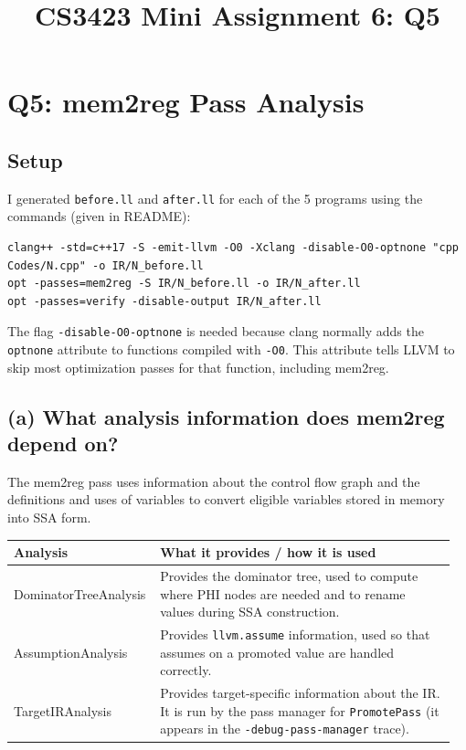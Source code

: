 \documentclass{article}
\title{CS3423 Mini Assignment 6: Q5}
\author{}
\date{}
\begin{document}
\maketitle

\section{Q5: mem2reg Pass Analysis}

\subsection{Setup}

I generated \texttt{before.ll} and \texttt{after.ll} for each of the 5
programs using the commands (given in README):

\begin{Verbatim}[fontsize=\small]
clang++ -std=c++17 -S -emit-llvm -O0 -Xclang -disable-O0-optnone "cpp Codes/N.cpp" -o IR/N_before.ll
opt -passes=mem2reg -S IR/N_before.ll -o IR/N_after.ll
opt -passes=verify -disable-output IR/N_after.ll
\end{Verbatim}

The flag \texttt{-disable-O0-optnone} is needed because clang normally
adds the \texttt{optnone} attribute to functions compiled with
\texttt{-O0}. This attribute tells LLVM to skip most optimization passes
for that function, including mem2reg.

\subsection{(a) What analysis information does mem2reg depend on?}

The mem2reg pass uses information about the control flow graph and the
definitions and uses of variables to convert eligible variables stored
in memory into SSA form.

\medskip
\noindent
\begin{tabular}{@{}p{0.30\linewidth}p{0.66\linewidth}@{}}
\toprule
Analysis & What it provides / how it is used \\
\midrule
DominatorTreeAnalysis & Provides the dominator tree, used to compute where
PHI nodes are needed and to rename values during SSA construction. \\
AssumptionAnalysis & Provides \texttt{llvm.assume} information, used so
that assumes on a promoted value are handled correctly. \\
TargetIRAnalysis & Provides target-specific information about the IR. It
is run by the pass manager for \texttt{PromotePass} (it appears in the
\texttt{-debug-pass-manager} trace). \\
\bottomrule
\end{tabular}
\medskip
\end{document}
